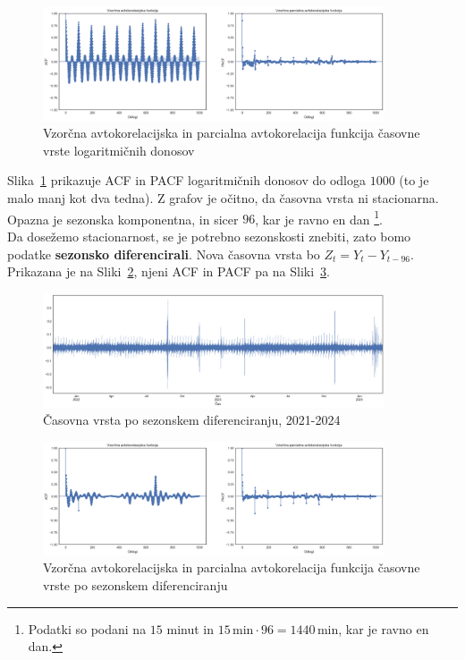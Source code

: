 \documentclass[a4paper, 11pt]{article}
\begin{document}
\begin{figure}[h!]
    \centering
    \caption{Vzorčna avtokorelacijska in parcialna avtokorelacija funkcija časovne vrste logaritmičnih donosov}\par\medskip
    \label{fig:log_returns_acf_pacf}
    \includegraphics[width=0.9\textwidth]{log_returns_acf_pacf.png}
\end{figure}

\noindent Slika~\ref{fig:log_returns_acf_pacf} prikazuje 
ACF in PACF logaritmičnih donosov do odloga $1000$ (to je
malo manj kot dva tedna). Z grafov je očitno, da časovna vrsta ni stacionarna. Opazna je sezonska komponentna, in sicer $96$, 
kar je ravno en dan \footnote{Podatki so podani na $15$ minut in $15\,\text{min} \cdot 96 = 1440\,\text{min}$, kar je ravno en dan.}. \\

\noindent Da dosežemo stacionarnost, se je potrebno sezonskosti znebiti, zato bomo podatke \textbf{sezonsko diferencirali}.
Nova časovna vrsta bo $Z_t = Y_t - Y_{t-96}$. Prikazana je na Sliki~\ref{fig:ts_diff}, njeni ACF in PACF pa na Sliki~\ref{fig:ts_diff_acf_pacf}.

\begin{figure}[h!]
    \centering
    \caption{Časovna vrsta po sezonskem diferenciranju, 2021-2024}\par\medskip
    \label{fig:ts_diff}
    \includegraphics[width=0.9\textwidth]{ts_diff.png}
\end{figure}

\begin{figure}[h!]
    \centering
    \caption{Vzorčna avtokorelacijska in parcialna avtokorelacija funkcija časovne vrste po sezonskem diferenciranju}\par\medskip
    \label{fig:ts_diff_acf_pacf}
    \includegraphics[width=0.9\textwidth]{ts_diff_acf_pacf.png}
\end{figure}
\end{document}
